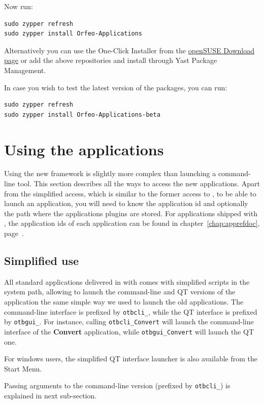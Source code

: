 Now run:
\begin{verbatim}
sudo zypper refresh
sudo zypper install Orfeo-Applications
\end{verbatim}

Alternatively you can use the One-Click Installer from the
\href{http://software.opensuse.org/search?q=Orfeo&baseproject=openSUSE\%3A11.4&lang=en&include_home=true&exclude_debug=true}{openSUSE
  Download page} or add the above repositories and install through
Yast Package Management.

In case you wish to test the latest version of the packages, you can run:
\begin{verbatim}
sudo zypper refresh
sudo zypper install Orfeo-Applications-beta
\end{verbatim}


\section{Using the applications}\label{sec:usingapps}

Using the new \app framework is slightly more complex than launching a
command-line tool. This section describes all the ways to access the
new applications. Apart from the simplified access, which is similar
to the former access to \app, to be able to launch an application, you
will need to know the application id and optionally the path where the
applications plugins are stored. For applications shipped with \otb,
the application ids of each application can be found in
chapter~\ref{chap:apprefdoc}, page~\pageref{chap:apprefdoc}.

\subsection{Simplified use}

All standard applications delivered in with \otb comes with simplified
scripts in the system path, allowing to launch the command-line and QT
versions of the application the same simple way we used to launch the
old applications. The command-line interface is prefixed by
\verb?otbcli_?, while the QT interface is prefixed by
\verb?otbgui_?. For instance, calling \verb?otbcli_Convert? will
launch the command-line interface of the \textbf{Convert} application,
while \verb?otbgui_Convert? will launch the QT one.

For windows users, the simplified QT interface launcher is also
available from the Start Menu.

Passing arguments to the command-line version (prefixed by
\verb?otbcli_?) is explained in next sub-section.

